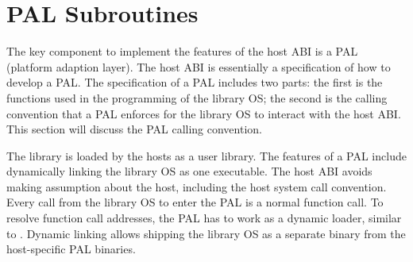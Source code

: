 

%
%
%



\section{PAL Subroutines}



The key component to implement the features of the host ABI
is a PAL (platform adaption layer).
The host ABI
is essentially a specification of how to develop a PAL.
The specification of a PAL
includes two parts: the first is the functions used in the programming of the library OS;
the second is the calling convention
that a PAL enforces for the library OS to interact with the host ABI.
This section will discuss the PAL calling convention.



The library is loaded by the hosts as a user library.
The features of a PAL include dynamically linking the library OS
as one executable.
The host ABI avoids making assumption about the host,
including the host system call convention.
Every call from the library OS to enter the PAL is a normal function call.
To resolve function call addresses,
the PAL has to work as a dynamic loader, similar to .
Dynamic linking allows shipping the library OS as a separate binary from the host-specific PAL binaries.
 



